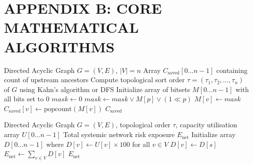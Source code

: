 \documentclass[12pt,a4paper]{report}
\begin{document}
\chapter*{APPENDIX B: CORE MATHEMATICAL ALGORITHMS}

\begin{algorithm}[h!]
\caption{Bitset Ancestor Reachability over Topological Order}
\label{alg:bitset_reachability}
\begin{algorithmic}[1]
\REQUIRE Directed Acyclic Graph $G = (V, E)$, $|V| = n$
\ENSURE Array $C_{\text{saved}}[0 \dots n-1]$ containing count of upstream ancestors
\STATE Compute topological sort order $\tau = (\tau_1, \tau_2, \dots, \tau_n)$ of $G$ using Kahn's algorithm or DFS
\STATE Initialize array of bitsets $M[0 \dots n-1]$ with all bits set to 0
    \STATE $mask \leftarrow 0$
        \STATE $mask \leftarrow mask \lor M[p] \lor (1 \ll p)$ 
    \ENDFOR
    \STATE $M[v] \leftarrow mask$
    \STATE $C_{\text{saved}}[v] \leftarrow \text{popcount}(M[v])$ 
\ENDFOR
\RETURN $C_{\text{saved}}$
\end{algorithmic}
\end{algorithm}

\begin{algorithm}[h!]
\caption{Dynamic Programming for Systemic Network Risk Exposure}
\label{alg:network_exposure}
\begin{algorithmic}[1]
\REQUIRE Directed Acyclic Graph $G = (V, E)$, topological order $\tau$, capacity utilisation array $U[0 \dots n-1]$
\ENSURE Total systemic network risk exposure $E_{\text{net}}$
\STATE Initialize array $D[0 \dots n-1]$ where $D[v] \leftarrow U[v] \times 100$ for all $v \in V$
 
            \STATE $D[v] \leftarrow D[s]$
        \ENDIF
    \ENDFOR
\ENDFOR
\STATE $E_{\text{net}} \leftarrow \sum_{v \in V} D[v]$
\RETURN $E_{\text{net}}$
\end{algorithmic}
\end{algorithm}
\end{document}
